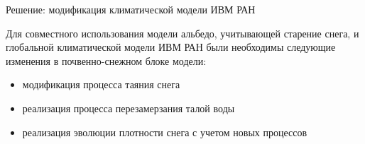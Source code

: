 \documentclass[unicode]{beamer}
\begin{document}
\begin{frame}{Решение: модификация климатической модели ИВМ РАН}

\footnotesize
Для совместного использования модели альбедо, учитывающей старение снега, и глобальной климатической модели ИВМ РАН были необходимы следующие изменения в почвенно-снежном блоке модели:

\begin{itemize}
    \item  модификация процесса таяния снега 
    \item  реализация процесса перезамерзания талой воды
    \item  реализация эволюции плотности снега с учетом новых процессов
\end{itemize}

\end{frame}
\end{document}
